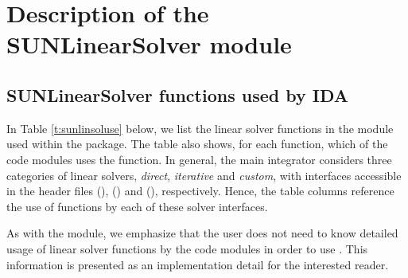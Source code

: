 \chapter{Description of the SUNLinearSolver module}\label{s:sunlinsol}



\section{SUNLinearSolver functions used by IDA}

In Table \ref{t:sunlinsoluse} below, we list the linear solver
functions in the {\sunlinsol} module used within the {\ida} package.
The table also shows, for each function, which of the code modules uses
the function.  In general, the main {\ida} integrator considers
three categories of linear solvers, \emph{direct}, \emph{iterative}
and \emph{custom}, with interfaces accessible in the {\ida} header
files  ({\idadls}), 
({\idaspils}) and  ({\idacls}), respectively.
Hence, the table columns reference the use of {\sunlinsol}
functions by each of these solver interfaces.

As with the {\sunmatrix} module, we emphasize that the {\ida} user
does not need to know detailed usage of linear solver functions by the
{\ida} code modules in order to use {\ida}. This information is
presented as an implementation detail for the interested reader.

